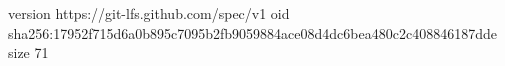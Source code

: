 version https://git-lfs.github.com/spec/v1
oid sha256:17952f715d6a0b895c7095b2fb9059884ace08d4dc6bea480c2c408846187dde
size 71
